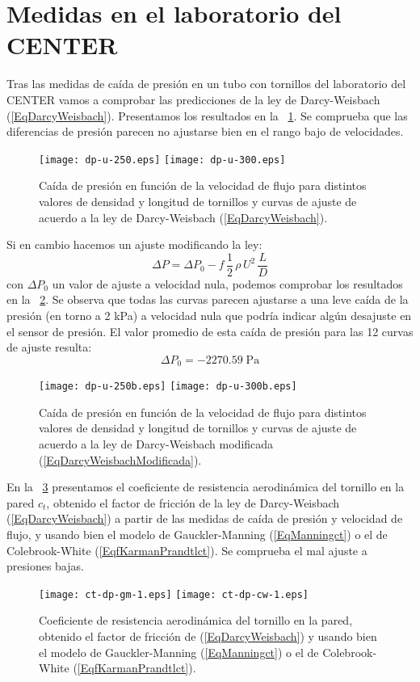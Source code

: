 \documentclass[a4paper]{article}
\newcommand{\EQ}[2]{\begin{equation}#1\label{#2}\end{equation}}
\begin{document}
\section{Medidas en el laboratorio del CENTER}

Tras las medidas de caída de presión en un tubo con tornillos del laboratorio
del CENTER vamos a comprobar las predicciones de la ley de Darcy-Weisbach
(\ref{EqDarcyWeisbach}). Presentamos los resultados en la
\figurename~\ref{Figdpu}. Se comprueba que las diferencias de presión parecen no ajustarse bien en el rango bajo de velocidades.
\begin{figure}[ht!]
\centering
\texttt{[image: dp-u-250.eps]}
\texttt{[image: dp-u-300.eps]}
\caption
{
  Caída de presión en función de la velocidad de flujo para distintos
  valores de densidad y longitud de tornillos y curvas de ajuste de acuerdo a la
  ley de Darcy-Weisbach (\ref{EqDarcyWeisbach}).\label{Figdpu}
}
\end{figure}

Si en cambio hacemos un ajuste modificando la ley:
\EQ{\Delta P=\Delta P_0-f\,\frac12\,\rho\,U^2\,\frac{L}{D}}
{EqDarcyWeisbachModificada}
con $\Delta P_0$ un valor de ajuste a velocidad nula, podemos comprobar los
resultados en la \figurename~\ref{Figdpub}. Se observa que todas las curvas
parecen ajustarse a una leve caída de la presión (en torno a 2 kPa) a velocidad
nula que podría indicar algún desajuste en el sensor de presión. El valor
promedio de esta caída de presión para las 12 curvas de ajuste resulta:
\EQ{\Delta P_0=-2270.59\;\mathrm{Pa}}{EqdP0}
\begin{figure}[ht!]
\centering
\texttt{[image: dp-u-250b.eps]}
\texttt{[image: dp-u-300b.eps]}
\caption
{
  Caída de presión en función de la velocidad de flujo para distintos
  valores de densidad y longitud de tornillos y curvas de ajuste de acuerdo a la
  ley de Darcy-Weisbach modificada (\ref{EqDarcyWeisbachModificada}).
  \label{Figdpub}
}
\end{figure}

En la \figurename~\ref{FigctI} presentamos el coeficiente de resistencia
aerodinámica del tornillo en la pared $c_t$, obtenido el factor de fricción de
la ley de Darcy-Weisbach (\ref{EqDarcyWeisbach}) a partir de las medidas de
caída de presión y velocidad de flujo, y usando bien el modelo de
Gauckler-Manning (\ref{EqManningct}) o el de Colebrook-White
(\ref{EqfKarmanPrandtlct}). Se comprueba el mal ajuste a presiones bajas.
\begin{figure}[ht!]
\centering
\texttt{[image: ct-dp-gm-1.eps]}
\texttt{[image: ct-dp-cw-1.eps]}
\caption
{
  Coeficiente de resistencia aerodinámica del tornillo en la pared, obtenido el
  factor de fricción de (\ref{EqDarcyWeisbach}) y usando bien el modelo de
  Gauckler-Manning (\ref{EqManningct}) o el de Colebrook-White
  (\ref{EqfKarmanPrandtlct}).\label{FigctI}
}
\end{figure}
\end{document}
